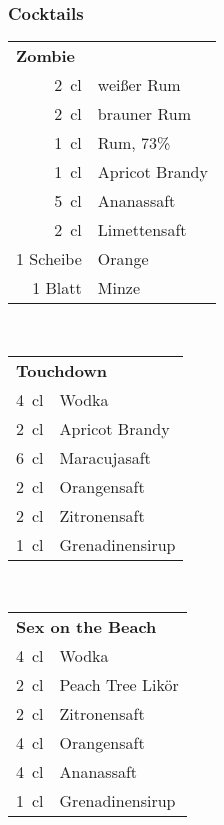 \subsubsection{Cocktails}
\begin{table}[h!]
  \begin{subtable}[t]{0.3\textwidth}
    \vspace{0pt}
    \begin{tabular}{|rl|} \hline
      \multicolumn{2}{|l|}{\textbf{Zombie}} \\
      \SI{2}{\centi\litre} & weißer Rum \\
      \SI{2}{\centi\litre} & brauner Rum \\
      \SI{1}{\centi\litre} & Rum, 73\% \\
      \SI{1}{\centi\litre} & Apricot Brandy \\
      \SI{5}{\centi\litre} & Ananassaft \\
      \SI{2}{\centi\litre} & Limettensaft \\
      1 Scheibe & Orange \\
      1 Blatt & Minze \\ \hline
    \end{tabular}
  \end{subtable}
  ~
  \begin{subtable}[t]{0.3\textwidth}
    \vspace{0pt}
    \begin{tabular}{|rl|} \hline
      \multicolumn{2}{|l|}{\textbf{Touchdown}} \\
      \SI{4}{\centi\litre} & Wodka \\
      \SI{2}{\centi\litre} & Apricot Brandy \\
      \SI{6}{\centi\litre} & Maracujasaft \\
      \SI{2}{\centi\litre} & Orangensaft \\
      \SI{2}{\centi\litre} & Zitronensaft \\
      \SI{1}{\centi\litre} & Grenadinensirup \\ \hline
    \end{tabular}
  \end{subtable}
  ~
  \begin{subtable}[t]{0.3\textwidth}
    \vspace{0pt}
    \begin{tabular}{|rl|} \hline
      \multicolumn{2}{|l|}{\textbf{Sex on the Beach}} \\
      \SI{4}{\centi\litre} & Wodka \\
      \SI{2}{\centi\litre} & Peach Tree Likör \\
      \SI{2}{\centi\litre} & Zitronensaft \\
      \SI{4}{\centi\litre} & Orangensaft \\
      \SI{4}{\centi\litre} & Ananassaft \\
      \SI{1}{\centi\litre} & Grenadinensirup \\ \hline
    \end{tabular}
  \end{subtable}


\end{table}
